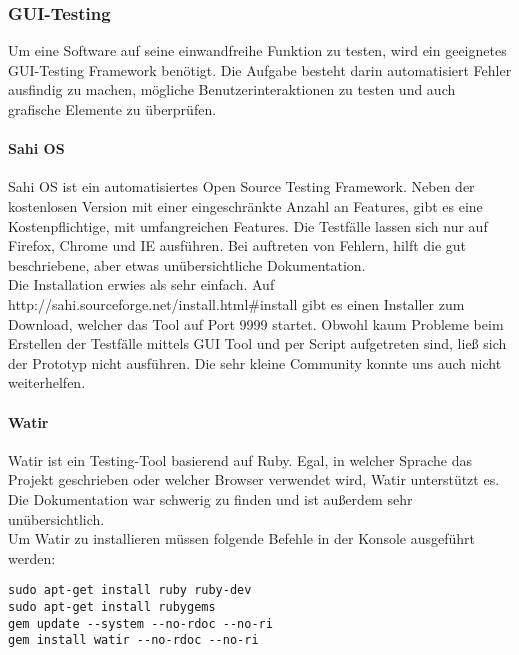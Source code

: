 
\subsubsection{GUI-Testing}
Um eine Software auf seine einwandfreihe Funktion zu testen, wird ein geeignetes GUI-Testing Framework benötigt. Die Aufgabe besteht darin automatisiert Fehler ausfindig zu machen, mögliche Benutzerinteraktionen zu testen und auch grafische Elemente zu überprüfen. 

\paragraph{Sahi OS}
Sahi OS ist ein automatisiertes Open Source Testing Framework. Neben der kostenlosen Version mit einer eingeschränkte Anzahl an Features, gibt es eine Kostenpflichtige, mit umfangreichen Features. Die Testfälle lassen sich nur auf Firefox, Chrome und IE ausführen. Bei auftreten von Fehlern, hilft die gut beschriebene, aber etwas unübersichtliche Dokumentation.\\

Die Installation erwies als sehr einfach. Auf http://sahi.sourceforge.net/install.html\#install gibt es einen Installer zum Download, welcher das Tool auf Port 9999 startet. Obwohl kaum Probleme beim Erstellen der Testfälle mittels GUI Tool und per Script aufgetreten sind, ließ sich der Prototyp nicht ausführen. Die sehr kleine Community konnte uns auch nicht weiterhelfen.

\paragraph{Watir}
Watir ist ein Testing-Tool basierend auf Ruby. Egal, in welcher Sprache das Projekt geschrieben oder welcher Browser verwendet wird, Watir unterstützt es.\\
Die Dokumentation war schwerig zu finden und ist außerdem sehr unübersichtlich. \cite{WATIR}\\

Um Watir zu installieren müssen folgende Befehle in der Konsole ausgeführt werden: 
\begin{lstlisting}[caption={Installation von Watir \cite{WATIRINSTALL}}]
sudo apt-get install ruby ruby-dev
sudo apt-get install rubygems
gem update --system --no-rdoc --no-ri
gem install watir --no-rdoc --no-ri
\end{lstlisting}


